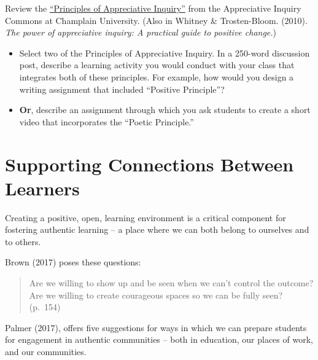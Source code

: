 \documentclass[
]{book}
\providecommand{\tightlist}{%
  \setlength{\itemsep}{0pt}\setlength{\parskip}{0pt}}
\begin{document}
\begin{reflect}
Review the
\href{https://appreciativeinquiry.champlain.edu/learn/appreciative-inquiry-introduction/5-classic-principles-ai/}{``Principles
of Appreciative Inquiry''} from the Appreciative Inquiry Commons at
Champlain University. (Also in Whitney \& Trosten-Bloom. (2010).
\emph{The power of appreciative inquiry: A practical guide to positive
change.})

\begin{itemize}
\tightlist
\item
  Select two of the Principles of Appreciative Inquiry. In a 250-word
  discussion post, describe a learning activity you would conduct with
  your class that integrates both of these principles. For example, how
  would you design a writing assignment that included ``Positive
  Principle''?\\
\item
  \textbf{Or}, describe an assignment through which you ask students to
  create a short video that incorporates the ``Poetic Principle.''
\end{itemize}
\end{reflect}

\hypertarget{supporting-connections-between-learners}{%
\section{Supporting Connections Between Learners}\label{supporting-connections-between-learners}}

Creating a positive, open, learning environment is a critical component for fostering authentic learning -- a place where we can both belong to ourselves and to others.

Brown (2017) poses these questions:

\begin{quote}
Are we willing to show up and be seen when we can't control the outcome? Are we willing to create courageous spaces so we can be fully seen? (p.~154)
\end{quote}

Palmer (2017), offers five suggestions for ways in which we can prepare students for engagement in authentic communities -- both in education, our places of work, and our communities.
\end{document}
